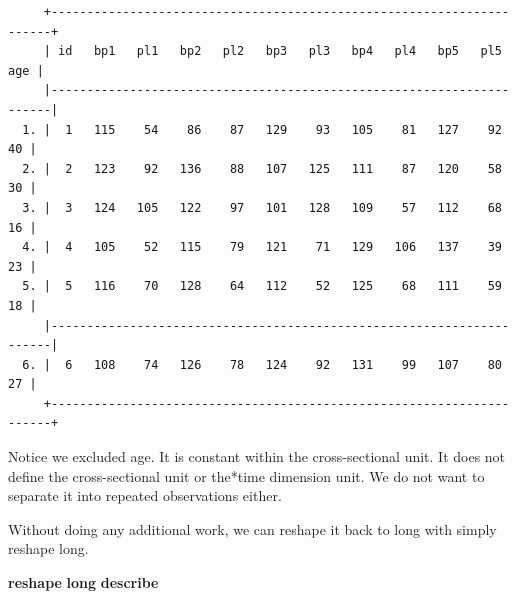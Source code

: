 \documentclass[
]{book}
\newenvironment{Shaded}{\begin{snugshade}}{\end{snugshade}}
\newcommand{\KeywordTok}[1]{\textcolor[rgb]{0.13,0.29,0.53}{\textbf{#1}}}
\begin{document}
\begin{verbatim}
     +----------------------------------------------------------------------+
     | id   bp1   pl1   bp2   pl2   bp3   pl3   bp4   pl4   bp5   pl5   age |
     |----------------------------------------------------------------------|
  1. |  1   115    54    86    87   129    93   105    81   127    92    40 |
  2. |  2   123    92   136    88   107   125   111    87   120    58    30 |
  3. |  3   124   105   122    97   101   128   109    57   112    68    16 |
  4. |  4   105    52   115    79   121    71   129   106   137    39    23 |
  5. |  5   116    70   128    64   112    52   125    68   111    59    18 |
     |----------------------------------------------------------------------|
  6. |  6   108    74   126    78   124    92   131    99   107    80    27 |
     +----------------------------------------------------------------------+
\end{verbatim}

Notice we excluded age. It is constant within the cross-sectional unit. It does not define the cross-sectional unit or the*time dimension unit. We do not want to separate it into repeated observations either.

Without doing any additional work, we can reshape it back to long with simply reshape long.

\begin{Shaded}
\begin{Highlighting}[]
\KeywordTok{reshape} \KeywordTok{long}
\KeywordTok{describe}
\end{Highlighting}
\end{Shaded}
\end{document}
